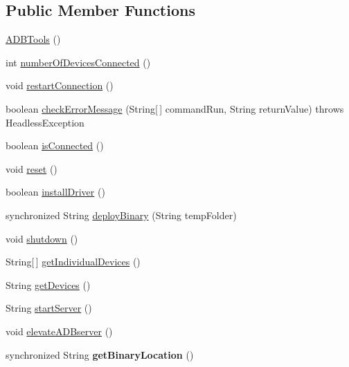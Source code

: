 \subsection*{Public Member Functions}
\begin{DoxyCompactItemize}
\item 
\hyperlink{class_c_a_s_u_a_l_1_1communicationstools_1_1adb_1_1_a_d_b_tools_aee532a6f0b295c9dc7f7eae458cc5a16}{A\-D\-B\-Tools} ()
\item 
int \hyperlink{class_c_a_s_u_a_l_1_1communicationstools_1_1adb_1_1_a_d_b_tools_a461c82203be61146b20039ecdf3a7ae7}{number\-Of\-Devices\-Connected} ()
\item 
void \hyperlink{class_c_a_s_u_a_l_1_1communicationstools_1_1adb_1_1_a_d_b_tools_ab15b541c5d89d360a9f46fb3f5d76315}{restart\-Connection} ()
\item 
boolean \hyperlink{class_c_a_s_u_a_l_1_1communicationstools_1_1adb_1_1_a_d_b_tools_a99c2fc63670a380b23c24753a036efec}{check\-Error\-Message} (String\mbox{[}$\,$\mbox{]} command\-Run, String return\-Value)  throws Headless\-Exception 
\item 
boolean \hyperlink{class_c_a_s_u_a_l_1_1communicationstools_1_1adb_1_1_a_d_b_tools_a4c683a1a71f68b1c50eadd438e7c3ed5}{is\-Connected} ()
\item 
void \hyperlink{class_c_a_s_u_a_l_1_1communicationstools_1_1adb_1_1_a_d_b_tools_aa91551344ddd6724490d06e7570b10d7}{reset} ()
\item 
boolean \hyperlink{class_c_a_s_u_a_l_1_1communicationstools_1_1adb_1_1_a_d_b_tools_ad02bc45e68c3b2102004309374a278e6}{install\-Driver} ()
\item 
synchronized String \hyperlink{class_c_a_s_u_a_l_1_1communicationstools_1_1adb_1_1_a_d_b_tools_a474cda9473f4e7d726fc0f780594a57d}{deploy\-Binary} (String temp\-Folder)
\item 
void \hyperlink{class_c_a_s_u_a_l_1_1communicationstools_1_1adb_1_1_a_d_b_tools_a9bdef58b74a1bfbe270ea5259ee0bd5e}{shutdown} ()
\item 
String\mbox{[}$\,$\mbox{]} \hyperlink{class_c_a_s_u_a_l_1_1communicationstools_1_1adb_1_1_a_d_b_tools_a3abf96e1e19c07136e4d9e0533023a71}{get\-Individual\-Devices} ()
\item 
String \hyperlink{class_c_a_s_u_a_l_1_1communicationstools_1_1adb_1_1_a_d_b_tools_a8d2da5fa61b82a00a60024675be69d0f}{get\-Devices} ()
\item 
String \hyperlink{class_c_a_s_u_a_l_1_1communicationstools_1_1adb_1_1_a_d_b_tools_a7b123fbc253f719b2f960f3d1481d9b8}{start\-Server} ()
\item 
void \hyperlink{class_c_a_s_u_a_l_1_1communicationstools_1_1adb_1_1_a_d_b_tools_a4a97cfb8be97201db41e6e35c5bce387}{elevate\-A\-D\-Bserver} ()
\item 
\hypertarget{class_c_a_s_u_a_l_1_1communicationstools_1_1adb_1_1_a_d_b_tools_a90f30d61fcab633f48db537aa917ca60}{synchronized String {\bfseries get\-Binary\-Location} ()}\label{class_c_a_s_u_a_l_1_1communicationstools_1_1adb_1_1_a_d_b_tools_a90f30d61fcab633f48db537aa917ca60}


\end{DoxyCompactItemize}
